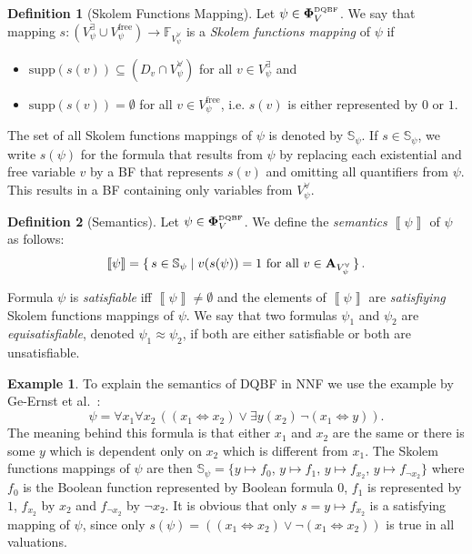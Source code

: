 \documentclass[
  digital, %
  twoside, %
  table,   %
  nolof,     %
  nolot,     %
]{fithesis3}
\let\setbuilder\set
\newcommand{\simpleset}[1]{\{{#1}\}}
\renewcommand{\set}[1]{\normalexpandarg\IfSubStr{#1}{|}{\setbuilder{#1}}{\simpleset{#1}}}
\theoremstyle{definition}
\newtheorem{definition}{Definition}
\newtheorem{example}{Example}
\theoremstyle{remark}
\newcommand{\seman}[1]{\left\llbracket {#1} \right\rrbracket}
\newcommand{\DQBF}[1]{\mathbf{\Phi}_{#1}^{\normalfont{\text{\tiny DQBF}}}}
\newcommand{\valtns}[1]{\mathbf{A}_{#1}}
\newcommand{\BFuncs}[1]{\mathbb{F}_{#1}}
\newcommand{\evars}[1]{V_{#1}^{\exists}}
\newcommand{\uvars}[1]{V_{#1}^{\forall}}
\newcommand{\fvars}[1]{V_{#1}^{\mathrm{free}}}
\newcommand{\supp}[1]{\mathrm{supp}(#1)}
\newcommand{\Scands}[1]{\mathbb{S}_{#1}}
\newcommand{\lequal}{\Leftrightarrow}
\newcommand{\itholds}{\,}
\begin{document}
\begin{definition}[Skolem Functions Mapping]
  Let $\psi \in \DQBF{V}$. We say that mapping $s\colon (\evars{\psi} \cup \fvars{\psi}) \to \BFuncs{\uvars{\psi}}$ is a \emph{Skolem functions mapping} of $\psi$ if
  \begin{itemize}
      \item $\supp{s(v)} \subseteq (D_v \cap \uvars{\psi})$ for all $v \in \evars{\psi}$ and
      \item $\supp{s(v)} = \emptyset$ for all $v \in \fvars{\psi}$, i.e. $s(v)$ is either represented by $0$ or $1$.
  \end{itemize}
\end{definition}

The set of all Skolem functions mappings of $\psi$ is denoted by $\Scands{\psi}$. If $s \in \Scands{\psi}$, we write $s(\psi)$ for the formula that results from $\psi$ by replacing each existential and free variable $v$ by a BF that represents $s(v)$ and omitting all quantifiers from $\psi$. This results in a BF containing only variables from $\uvars{\psi}$.

\begin{definition}[Semantics]
  Let $\psi \in \DQBF{V}$. We define the \emph{semantics} $\seman{\psi}$ of $\psi$ as follows:
  \[\seman{\psi} = \set{s \in \Scands{\psi} | v(s(\psi))=1 \text{ for all } v \in \valtns{\uvars{\psi}}}.\]
\end{definition}
Formula $\psi$ is \emph{satisfiable} iff $\seman{\psi} \not= \emptyset$ and the elements of $\seman{\psi}$ are \emph{satisfiying} Skolem functions mappings of $\psi$. We say that two formulas $\psi_1$ and $\psi_2$ are \emph{equisatisfiable}, denoted $\psi_1 \approx \psi_2$, if both are either satisfiable or both are unsatisfiable.
\begin{example}
\label{ex:DQBF:NNF}
To explain the semantics of DQBF in NNF we use the example by Ge-Ernst et al.~\cite{HQSquantifierLocalization}:
\[\psi = \forall x_1 \forall x_2\itholds ((x_1 \lequal x_2) \lor \exists y (x_2)\itholds \neg(x_1 \lequal y)).\]
The meaning behind this formula is that either $x_1$ and $x_2$ are the same or there is some $y$ which is dependent only on $x_2$ which is different from $x_1$. The Skolem functions mappings of $\psi$ are then $\Scands{\psi} = \{y\mapsto f_0$, $y\mapsto f_1$, $y\mapsto f_{x_2}$, $y\mapsto f_{\neg x_2}\}$ %
where $f_0$ is the Boolean function represented by Boolean formula $0$, $f_1$ is represented by $1$, $f_{x_2}$ by $x_2$ and $f_{\neg x_2}$ by $\neg x_2$. It is obvious that only $s = y \mapsto f_{x_2}$ is a satisfying mapping of $\psi$, since only $s(\psi) = ((x_1 \lequal x_2) \lor \neg(x_1 \lequal x_2))$ is true in all valuations.
\end{example}
\end{document}
